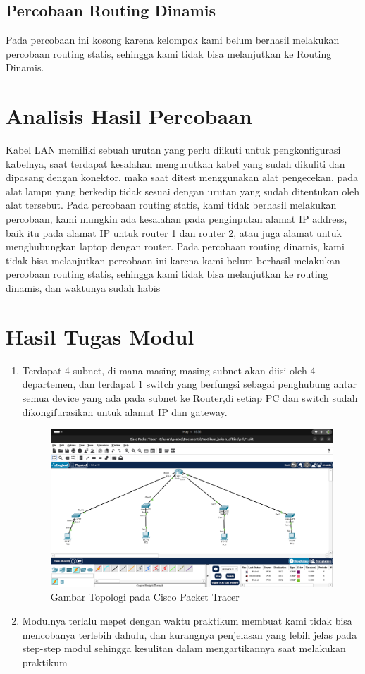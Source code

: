 \subsection{Percobaan Routing Dinamis}
Pada percobaan ini kosong karena kelompok kami belum berhasil melakukan percobaan routing statis,
sehingga kami tidak bisa melanjutkan ke Routing Dinamis.

\section{Analisis Hasil Percobaan}
Kabel LAN memiliki sebuah urutan yang perlu diikuti untuk pengkonfigurasi kabelnya, saat terdapat kesalahan
mengurutkan kabel yang sudah dikuliti dan dipasang dengan konektor, maka saat ditest menggunakan alat 
pengecekan, pada alat lampu yang berkedip tidak sesuai dengan urutan yang sudah ditentukan oleh alat tersebut.
Pada percobaan routing statis, kami tidak berhasil melakukan percobaan, kami mungkin ada kesalahan pada penginputan 
alamat IP address, baik itu pada alamat IP untuk router 1 dan router 2, atau juga alamat untuk menghubungkan
laptop dengan router. Pada percobaan routing dinamis, kami tidak bisa melanjutkan percobaan ini karena kami belum berhasil
melakukan percobaan routing statis, sehingga kami tidak bisa melanjutkan ke routing dinamis, dan waktunya
sudah habis
\section{Hasil Tugas Modul}
\begin{enumerate}
    \item Terdapat 4 subnet, di mana masing masing subnet akan diisi oleh 4 departemen, dan terdapat 1 switch
    yang berfungsi sebagai penghubung antar semua device yang ada pada subnet ke Router,di setiap PC dan switch
    sudah dikongifurasikan untuk alamat IP dan gateway. 
	\begin{figure}[H]
		\centering
		\includegraphics[width=0.5\linewidth]{cisco.png}
		\caption{Gambar Topologi pada Cisco Packet Tracer}
		\label{fig:gambar1}
	\end{figure}
    \item Modulnya terlalu mepet dengan waktu praktikum membuat kami tidak bisa mencobanya terlebih dahulu, dan kurangnya penjelasan yang lebih jelas 
    pada step-step modul sehingga kesulitan dalam mengartikannya saat melakukan praktikum
\end{enumerate}


